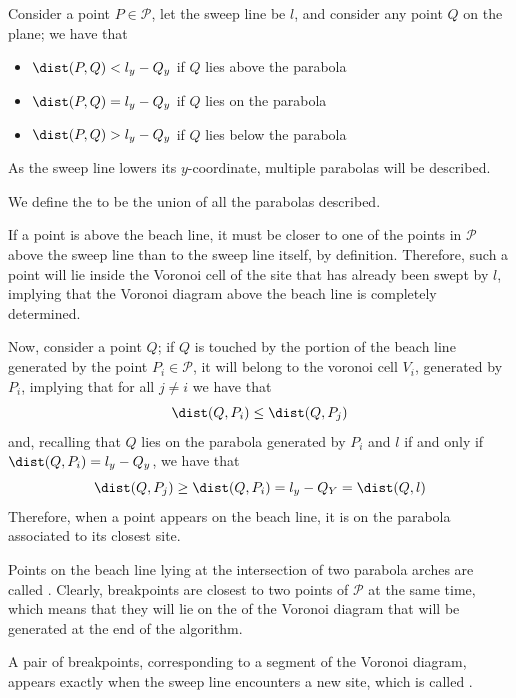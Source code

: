 \documentclass[a4paper, 12pt]{report}
\begin{document}

    Consider a point $P \in \mathcal P$, let the sweep line be $l$, and consider any point $Q$ on the plane; we have that

    \begin{itemize}
        \item $\dist(P, Q) < l_y - Q_y$ if $Q$ lies above the parabola
        \item $\dist(P, Q) = l_y - Q_y$ if $Q$ lies on the parabola
        \item $\dist(P, Q) > l_y - Q_y$ if $Q$ lies below the parabola
    \end{itemize}

    As the sweep line lowers its $y$-coordinate, multiple parabolas will be described.


    We define the  to be the union of all the parabolas described.


    If a point is above the beach line, it must be closer to one of the points in $\mathcal P$ above the sweep line than to the sweep line itself, by definition. Therefore, such a point will lie inside the Voronoi cell of the site that has already been swept by $l$, implying that the Voronoi diagram above the beach line is completely determined.

    Now, consider a point $Q$; if $Q$ is touched by the portion of the beach line generated by the point $P_i \in \mathcal P$, it will belong to the voronoi cell $V_i$, generated by $P_i$, implying that for all $j \neq i$ we have that $$\dist(Q, P_i) \le \dist(Q, P_j)$$ and, recalling that $Q$ lies on the parabola generated by $P_i$ and $l$ if and only if $\dist(Q, P_i) = l_y - Q_y$, we have that $$\dist(Q, P_j) \ge \dist(Q, P_i) = l_y - Q_Y = \dist(Q, l)$$ Therefore, when a point appears on the beach line, it is on the parabola associated to its closest site.

    Points on the beach line lying at the intersection of two parabola arches are called . Clearly, breakpoints are closest to two points of $\mathcal P$ at the same time, which means that they will lie on the  of the Voronoi diagram that will be generated at the end of the algorithm.

    A pair of breakpoints, corresponding to a segment of the Voronoi diagram, appears exactly when the sweep line encounters a new site, which is called .
\end{document}
